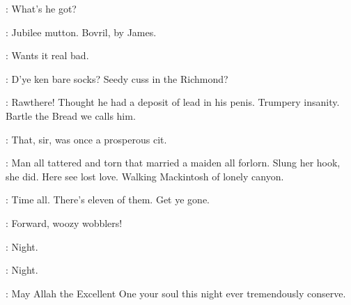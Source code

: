 \documentclass[12pt]{article}
\begin{document}
\SD: What's he got?

\Dx: Jubilee mutton.
Bovril, by James.

\Ln: Wants it real bad.

\Cr: D'ye ken bare socks?
Seedy cuss in the Richmond?

\Dx: Rawthere!
Thought he had a deposit of lead in his penis.
Trumpery insanity.
Bartle the Bread we calls him.

\Ly: That, sir, was once a prosperous cit.

\Bl: Man all tattered and torn that married a maiden all forlorn.
Slung her hook, she did.
Here see lost love.
Walking Mackintosh of lonely canyon.




















\Br: Time all. There's eleven of them. Get ye gone.

\Ln: Forward, woozy wobblers!

\Ly: Night.

\PC: Night.

\Dx: May Allah the Excellent One your soul this night ever
tremendously conserve.

\end{document}
